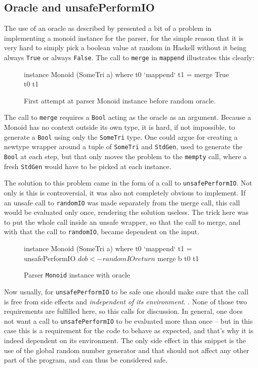 \documentclass[a4paper,12pt,twosided]{report}
\renewcommand\cite{\citep}
\begin{document}
\subsection{Oracle and unsafePerformIO}
\label{oraclesection}
The use of an oracle as described by \citet{parparsepaper} presented a bit
of a problem in implementing a monoid instance for the parser, for the simple
reason that it is very hard to simply pick a boolean value at random in Haskell
without it being always \texttt{True} or always \texttt{False}. The call to
\texttt{merge} in \texttt{mappend} illustrates this clearly:

\begin{figure}[H]
\begin{code}
instance Monoid (SomeTri a) where
    t0 `mappend` t1 = merge True t0 t1
\end{code}
\caption{First attempt at parser Monoid instance before random oracle.}
\end{figure}

The call to \texttt{merge} requires a \texttt{Bool} acting as the oracle as an
argument. Because a Monoid has no context outside its own type, it is hard, if not
impossible, to generate a \texttt{Bool} using only the \texttt{SomeTri} type.
One could argue for creating a newtype wrapper around a tuple of
\texttt{SomeTri} and \texttt{StdGen}, used to generate the \texttt{Bool} at each
step, but that only moves the problem to the \texttt{mempty}
call, where a fresh \texttt{StdGen} would have to be picked at each instance.

The solution to this problem came in the form of a call to
\texttt{unsafePerformIO}.  Not only is this is controversial, it was also not
completely obvious to implement. If an unsafe call to \texttt{randomIO} was made
separately from the merge call, this call would be evaluated only once,
rendering the solution useless. The trick here was to put the whole call inside
an unsafe wrapper, so that the call to merge, and with that the call to
\texttt{randomIO}, became dependent on the input.

\begin{figure}[H]
\begin{code}
instance Monoid (SomeTri a) where
    t0 `mappend` t1 = unsafePerformIO $ do
      b <- randomIO
      return $ merge b t0 t1
\end{code}
\caption{Parser \texttt{Monoid} instance with oracle}
\end{figure}

Now usually, for \texttt{unsafePerformIO} to be safe one should make sure that
the call is free from side effects and \textit{independent of its environment}.
\cite{unsafeHackage}. None of those two requirements are fulfilled here, so 
this calls for discussion. In general, one does not want a call to
\texttt{unsafePerformIO} to be evaluated more than once -- but in this case this
is a requirement for the code to behave as expected, and that's why it is indeed
dependent on its environment. The only side effect in this snippet is the use of
the global random number generator and that should not affect any other part of
the program, and can thus be considered safe.
\end{document}
